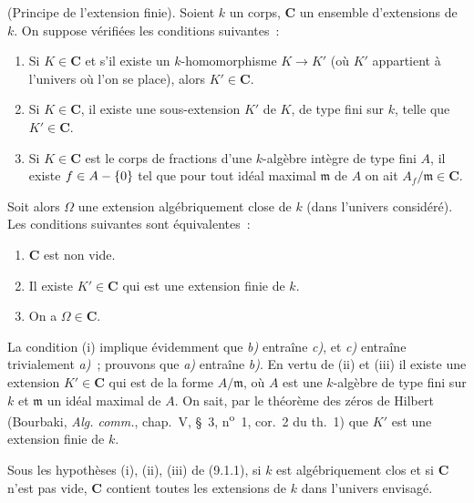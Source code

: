 \begin{proposition}[9.1.1]
\label{IV.9.1.1-fr}
\textnormal{(Principe de l'extension finie).} Soient $k$ un corps,
$\boldsymbol{C}$ un ensemble d'extensions de $k$. On suppose vérifiées les
conditions suivantes~:
\begin{enumerate}[label=\textup{(\roman*)}]
  \item Si $K\in\boldsymbol{C}$ et s'il existe un $k$-homomorphisme $K\to K'$
  (où $K'$ appartient à l'univers où l'on se place), alors
  $K'\in\boldsymbol{C}$.
  \item Si $K\in\boldsymbol{C}$, il existe une sous-extension $K'$ de $K$, de
  type fini sur $k$, telle que $K'\in\boldsymbol{C}$.
  \item Si $K\in\boldsymbol{C}$ est le corps de fractions d'une $k$-algèbre
  intègre de type fini $A$, il existe $f\in A-\{0\}$ tel que pour tout idéal
  maximal $\mathfrak m$ de $A$ on ait $A_f/\mathfrak m\in\boldsymbol{C}$.
\end{enumerate}

Soit alors $\Omega$ une extension algébriquement close de $k$ (dans l'univers
considéré). Les conditions suivantes sont équivalentes~:
\begin{enumerate}[label=\emph{\alph*)}]
  \item $\boldsymbol{C}$ est non vide.
  \item Il existe $K'\in\boldsymbol{C}$ qui est une extension \textup{finie} de $k$.
  \item On a $\Omega\in\boldsymbol{C}$.
\end{enumerate}
\end{proposition}

La condition (i) implique évidemment que \emph{b)} entraîne \emph{c)}, et
\emph{c)} entraîne trivialement \emph{a)}~; prouvons que \emph{a)} entraîne
\emph{b)}. En vertu de (ii) et (iii) il existe une extension
$K'\in\boldsymbol{C}$ qui est de la forme $A/\mathfrak m$, où $A$ est une
$k$-algèbre de type fini sur $k$ et $\mathfrak m$ un idéal maximal de $A$.
On sait, par le théorème des zéros de Hilbert (Bourbaki, \emph{Alg. comm.},
chap.~V, \S~3, n\textsuperscript{o}~1, cor.~2 du th.~1) que $K'$ est une
extension finie de $k$.

\begin{corollary}[9.1.2]
\label{IV.9.1.2-fr}
Sous les hypothèses \textup{(i), (ii), (iii)} de \textup{(9.1.1)}, si $k$ est algébriquement
clos et si $\boldsymbol{C}$ n'est pas vide, $\boldsymbol{C}$ contient toutes les
extensions de $k$ dans l'univers envisagé.
\end{corollary}

